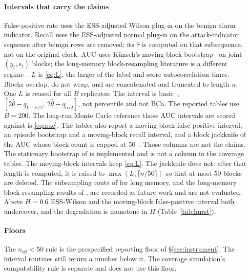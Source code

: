 \documentclass[a4paper,fleqn]{cas-dc}
\newcommand{\neff}{n_{\mathrm{eff}}}
\begin{document}
\paragraph{Intervals that carry the claims} False-positive rate uses the ESS-adjusted Wilson
plug-in on the benign alarm indicator. Recall uses the ESS-adjusted normal plug-in on the
attack-indicator sequence after benign rows are removed; its $\hat\tau$ is computed on that
subsequence, not on the original clock. AUC uses K\"unsch's moving-block
bootstrap~\citep{kunsch1989jackknife,dehling2010ustat} on joint $(y_t,s_t)$ blocks; the long-memory
block-resampling literature is a different
regime~\citep{zhang2022block,arteche2024bootstrap,lahiri1993mbb}. $L$ is \eqref{eq:L}, the larger
of the label and score autocorrelation times. Blocks overlap, do not wrap, and are concatenated and
truncated to length $n$. One $L$ is reused for all $B$ replicates. The interval is basic~\citep{davison1997bootstrap},
$[2\hat\theta-q_{1-\alpha/2},\,2\hat\theta-q_{\alpha/2}]$, not percentile and not BCa. The reported
tables use $B{=}200$. The long-run Monte Carlo reference those AUC intervals are scored against
is \eqref{eq:auc}. The tables also report a moving-block false-positive interval, an
episode bootstrap and a moving-block recall interval, and a block jackknife of the AUC whose block
count is capped at 50~\citep{dehling2010ustat}. Those columns are not the claims. The stationary
bootstrap of \citet{politis1994stationary} is implemented and is not a column in
the coverage tables. The moving-block intervals keep \eqref{eq:L}. The jackknife does not: after
that length is computed, it is raised to $\max(L,\lceil n/50\rceil)$ so that at most $50$ blocks
are deleted.
The subsampling route of \citet{politis1999subsampling} for long memory,
and the long-memory block-resampling results of \citet{zhang2022block}, are
recorded as future work and are not evaluated. Above $H{=}0.6$ ESS-Wilson and the moving-block
false-positive interval both undercover, and the degradation is monotone in $H$
(Table~\ref{tab:hurst}).

\paragraph{Floors} The $\neff<50$ rule is the prespecified reporting floor of
\S\ref{sec:instrument}. The interval routines still return a number below it. The coverage
simulation's computability rule is separate and does not use this floor.
\end{document}
